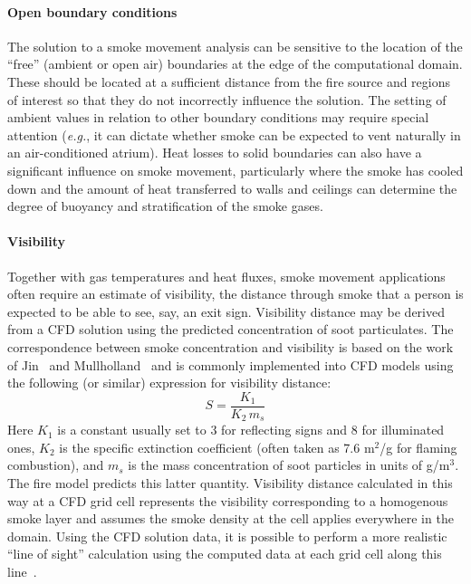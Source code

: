 \documentclass[graybox]{svmult}
\begin{document}
\paragraph{Open boundary conditions}

The solution to a smoke movement analysis can be sensitive to the location of the ``free'' (ambient or open air) boundaries at the edge of the computational domain. These should be located at a sufficient distance from the fire source and regions of interest so that they do not incorrectly influence the solution. The setting of ambient values in relation to other boundary conditions may require special attention ({\em e.g.}, it can dictate whether smoke can be expected to vent naturally in an air-conditioned atrium). Heat losses to solid boundaries can also have a significant influence on smoke movement, particularly where the smoke has cooled down and the amount of heat transferred to walls and ceilings can determine the degree of buoyancy and stratification of the smoke gases.

\paragraph{Visibility}

Together with gas temperatures and heat fluxes, smoke movement applications often require an estimate of visibility, the distance through smoke that a person is expected to be able to see, say, an exit sign. Visibility distance may be derived from a CFD solution using the predicted concentration of soot particulates. The correspondence between smoke concentration and visibility is based on the work of Jin~\cite{Jin} and Mullholland~\cite{Mulholland} and is commonly implemented into CFD models using the following (or similar) expression for visibility distance:
\begin{equation}
S = \frac{K_1}{K_2 \, m_s}
\label{eq:vis}
\end{equation}
Here $K_1$ is a constant usually set to 3 for reflecting signs and 8 for illuminated ones, $K_2$ is the specific extinction coefficient (often taken as 7.6 m$^2$/g for flaming combustion), and $m_s$ is the mass concentration of soot particles in units of g/m$^3$.  The fire model predicts this latter quantity. Visibility distance calculated in this way at a CFD grid cell represents the visibility corresponding to a homogenous smoke layer and assumes the smoke density at the cell applies everywhere in the domain. Using the CFD solution data, it is possible to perform a more realistic ``line of sight'' calculation using the computed data at each grid cell along this line~\cite{Husted}.
\end{document}
